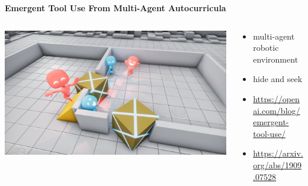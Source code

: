 \documentclass[xcolor=dvipsnames]{beamer}
\begin{document}
\begin{frame}{\bf Emergent Tool Use From Multi-Agent Autocurricula}


  \begin{columns}

      \begin{column}{0.5\textwidth}
        \includegraphics[scale=0.08]{../images/hide_and_seek.jpg}
      \end{column}

      \begin{column}{0.5\textwidth}
        \begin{itemize}
          \item multi-agent robotic environment
          \item hide and seek
          \item \url{https://openai.com/blog/emergent-tool-use/}
          \item \url{https://arxiv.org/abs/1909.07528}
        \end{itemize}
      \end{column}


  \end{columns} 

\end{frame}
\end{document}
